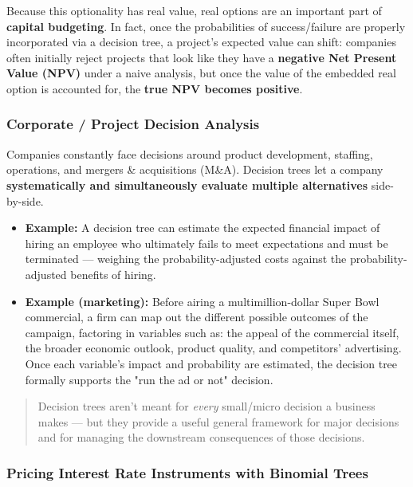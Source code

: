 \documentclass[12pt,openany]{book}
\begin{document}
Because this optionality has real value, real options are an important part of \textbf{capital budgeting}. In fact, once the probabilities of success/failure are properly incorporated via a decision tree, a project's expected value can shift: companies often initially reject projects that look like they have a \textbf{negative Net Present Value (NPV)} under a naive analysis, but once the value of the embedded real option is accounted for, the \textbf{true NPV becomes positive}.

\subsubsection{Corporate / Project Decision Analysis}


Companies constantly face decisions around product development, staffing, operations, and mergers \& acquisitions (M\&A). Decision trees let a company \textbf{systematically and simultaneously evaluate multiple alternatives} side-by-side.

\begin{itemize}[leftmargin=*]
    \item \textbf{Example:} A decision tree can estimate the expected financial impact of hiring an employee who ultimately fails to meet expectations and must be terminated --- weighing the probability-adjusted costs against the probability-adjusted benefits of hiring.
    \item \textbf{Example (marketing):} Before airing a multimillion-dollar Super Bowl commercial, a firm can map out the different possible outcomes of the campaign, factoring in variables such as: the appeal of the commercial itself, the broader economic outlook, product quality, and competitors' advertising. Once each variable's impact and probability are estimated, the decision tree formally supports the "run the ad or not" decision.

\end{itemize}

\begin{quote}
Decision trees aren't meant for \textit{every} small/micro decision a business makes --- but they provide a useful general framework for major decisions and for managing the downstream consequences of those decisions.
\end{quote}


\subsubsection{Pricing Interest Rate Instruments with Binomial Trees}
\end{document}
